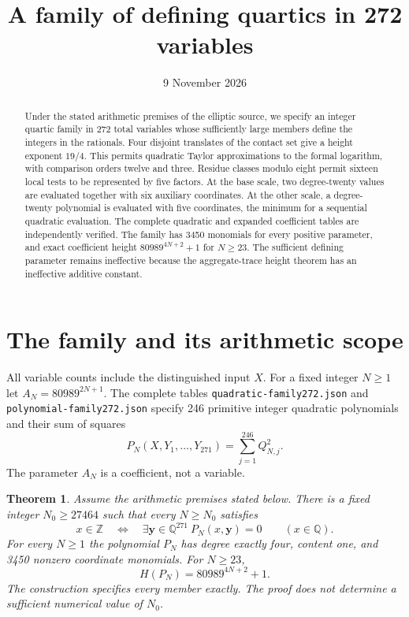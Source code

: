 \documentclass[11pt,a4paper]{article}
\title{A family of defining quartics in 272 variables}
\author{}\date{9 November 2026}
\newtheorem{theorem}{Theorem}[section]\newtheorem{lemma}[theorem]{Lemma}
\newcommand{\Q}{\mathbb Q}\newcommand{\Z}{\mathbb Z}\newcommand{\HH}{\mathcal H}
\begin{document}
\maketitle
\begin{abstract}
Under the stated arithmetic premises of the elliptic source, we specify
an integer quartic family in 272 total variables whose sufficiently
large members define the integers in the rationals. Four disjoint
translates of the contact set give a height exponent $19/4$. This permits
quadratic Taylor approximations to the formal logarithm, with comparison
orders twelve and three. Residue classes modulo eight permit sixteen local tests to be represented
by five factors. At the base scale, two degree-twenty values are evaluated together
with six auxiliary coordinates. At the other scale, a degree-twenty
polynomial is evaluated with five coordinates, the minimum for a
sequential quadratic evaluation. The complete
quadratic and expanded coefficient tables are independently verified.
The family has 3450 monomials for every positive parameter, and exact
coefficient height $80989^{4N+2}+1$ for $N\ge23$. The sufficient defining
parameter remains ineffective because the aggregate-trace height theorem
has an ineffective additive constant.
\end{abstract}

\section{The family and its arithmetic scope}
All variable counts include the distinguished input $X$. For a fixed
integer $N\ge1$ let $A_N=80989^{2N+1}$. The complete tables
\nolinkurl{quadratic-family272.json} and
\nolinkurl{polynomial-family272.json} specify 246 primitive integer
quadratic polynomials and their sum of squares
\[
 P_N(X,Y_1,\ldots,Y_{271})=\sum_{j=1}^{246}Q_{N,j}^2.
\]
The parameter $A_N$ is a coefficient, not a variable.

\begin{theorem}\label{thm:main}
Assume the arithmetic premises stated below. There is a fixed integer
$N_0\ge27464$ such that every $N\ge N_0$ satisfies
\[
 x\in\Z\quad\Longleftrightarrow\quad
 \exists\mathbf y\in\Q^{271}\ P_N(x,\mathbf y)=0
 \qquad(x\in\Q).
\]
For every $N\ge1$ the polynomial $P_N$ has degree exactly four,
content one, and 3450 nonzero coordinate monomials. For $N\ge23$,
\[
                       H(P_N)=80989^{4N+2}+1.
\]
The construction specifies every member exactly. The proof does not
determine a sufficient numerical value of $N_0$.
\end{theorem}
\end{document}
